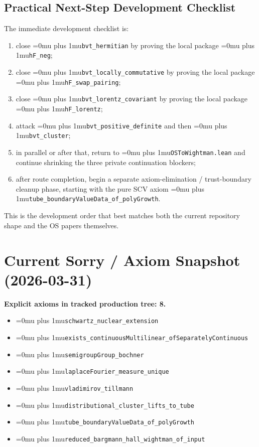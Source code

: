 \documentclass[11pt,a4paper]{article}
\newcommand{\leanfile}[1]{\begingroup\Urlmuskip=0mu plus 1mu\relax\nolinkurl{#1}\endgroup}
\newcommand{\leanname}[1]{\begingroup\Urlmuskip=0mu plus 1mu\relax\nolinkurl{#1}\endgroup}
\begin{document}
\subsection{Practical Next-Step Development Checklist}

The immediate development checklist is:
\begin{enumerate}
\item close \leanname{bvt\_hermitian} by proving the local package
  \leanname{hF\_neg};
\item close \leanname{bvt\_locally\_commutative} by proving the local package
  \leanname{hF\_swap\_pairing};
\item close \leanname{bvt\_lorentz\_covariant} by proving the local package
  \leanname{hF\_lorentz};
\item attack \leanname{bvt\_positive\_definite} and then
  \leanname{bvt\_cluster};
\item in parallel or after that, return to \leanfile{OSToWightman.lean} and
  continue shrinking the three private continuation blockers;
\item after route completion, begin a separate axiom-elimination / trust-boundary
  cleanup phase, starting with the pure SCV axiom
  \leanname{tube\_boundaryValueData\_of\_polyGrowth}.
\end{enumerate}

\medskip\noindent
This is the development order that best matches both the current repository
shape and the OS papers themselves.


\section{Current Sorry / Axiom Snapshot (2026-03-31)}

\textbf{Explicit axioms in tracked production tree: 8.}
\begin{itemize}
\item \leanname{schwartz\_nuclear\_extension}
\item \leanname{exists\_continuousMultilinear\_ofSeparatelyContinuous}
\item \leanname{semigroupGroup\_bochner}
\item \leanname{laplaceFourier\_measure\_unique}
\item \leanname{vladimirov\_tillmann}
\item \leanname{distributional\_cluster\_lifts\_to\_tube}
\item \leanname{tube\_boundaryValueData\_of\_polyGrowth}
\item \leanname{reduced\_bargmann\_hall\_wightman\_of\_input}
\end{itemize}
\end{document}

